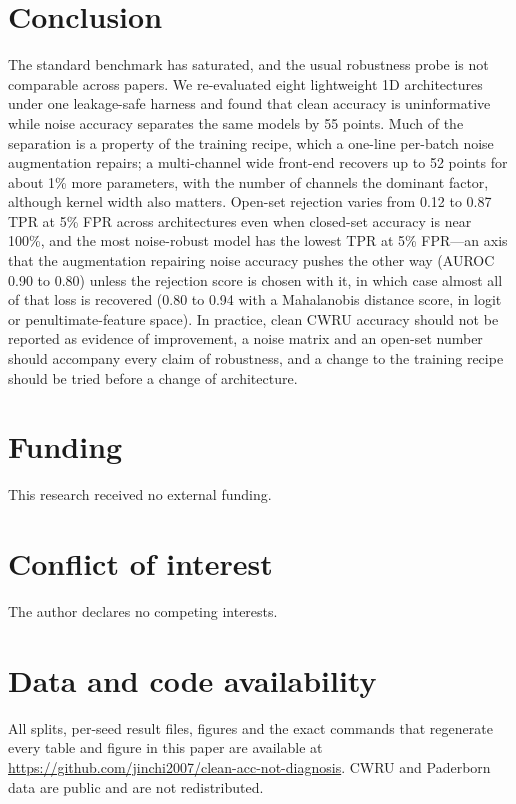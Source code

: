 \section{Conclusion}

The standard benchmark has saturated, and the usual robustness probe is not comparable across papers. We re-evaluated eight lightweight 1D architectures under one leakage-safe harness and found that clean accuracy is uninformative while noise accuracy separates the same models by 55 points. Much of the separation is a property of the training recipe, which a one-line per-batch noise augmentation repairs; a multi-channel wide front-end recovers up to 52 points for about 1\% more parameters, with the number of channels the dominant factor, although kernel width also matters. Open-set rejection varies from 0.12 to 0.87 TPR at 5\% FPR across architectures even when closed-set accuracy is near 100\%, and the most noise-robust model has the lowest TPR at 5\% FPR---an axis that the augmentation repairing noise accuracy pushes the other way (AUROC 0.90 to 0.80) unless the rejection score is chosen with it, in which case almost all of that loss is recovered (0.80 to 0.94 with a Mahalanobis distance score, in logit or penultimate-feature space). In practice, clean CWRU accuracy should not be reported as evidence of improvement, a noise matrix and an open-set number should accompany every claim of robustness, and a change to the training recipe should be tried before a change of architecture.

\section*{Funding}
This research received no external funding.

\section*{Conflict of interest}
The author declares no competing interests.

\section*{Data and code availability}
All splits, per-seed result files, figures and the exact commands that regenerate every table and figure in this paper are available at \url{https://github.com/jinchi2007/clean-acc-not-diagnosis}. CWRU and Paderborn data are public and are not redistributed.

